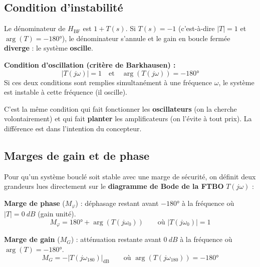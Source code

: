 \documentclass[12pt,a4paper,twoside]{book}
\begin{document}
\subsection{Condition d'instabilité}

Le dénominateur de $H_{\text{BF}}$ est $1 + T(s)$. Si $T(s) = -1$ (c'est-à-dire $|T| = 1$ et $\arg(T) = -180°$), le dénominateur s'annule et le gain en boucle fermée \textbf{diverge} : le système \textbf{oscille}.

\begin{formule}
\textbf{Condition d'oscillation (critère de Barkhausen) :}
\[
\boxed{|T(j\omega)| = 1 \quad \text{et} \quad \arg(T(j\omega)) = -180°}
\]
Si ces deux conditions sont remplies simultanément à une fréquence $\omega$, le système est instable à cette fréquence (il oscille).
\end{formule}

\begin{attention}
C'est la même condition qui fait fonctionner les \textbf{oscillateurs} (on la cherche volontairement) et qui fait \textbf{planter} les amplificateurs (on l'évite à tout prix). La différence est dans l'intention du concepteur.
\end{attention}

\subsection{Marges de gain et de phase}

Pour qu'un système bouclé soit stable avec une marge de sécurité, on définit deux grandeurs lues directement sur le \textbf{diagramme de Bode de la FTBO} $T(j\omega)$ :

\begin{formule}
\textbf{Marge de phase} ($M_\varphi$) : déphasage restant avant $-180°$ à la fréquence où $|T| = \SI{0}{dB}$ (gain unité).
\[
\boxed{M_\varphi = 180° + \arg(T(j\omega_0))} \qquad \text{où } |T(j\omega_0)| = 1
\]

\textbf{Marge de gain} ($M_G$) : atténuation restante avant $\SI{0}{dB}$ à la fréquence où $\arg(T) = -180°$.
\[
\boxed{M_G = -|T(j\omega_{180})|_{\text{dB}}} \qquad \text{où } \arg(T(j\omega_{180})) = -180°
\]
\end{formule}
\end{document}
